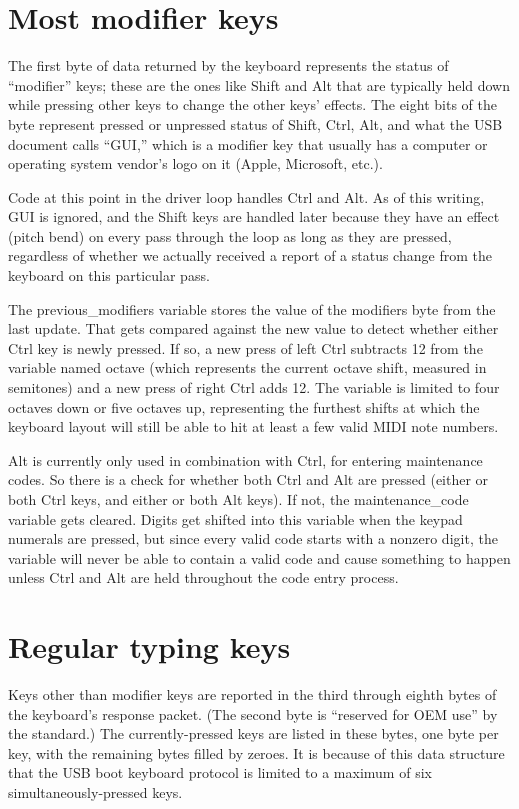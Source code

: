 \section{Most modifier keys}

The first byte of data returned by the keyboard represents the status of
``modifier'' keys; these are the ones like Shift and Alt that are typically
held down while pressing other keys to change the other keys' effects.  The
eight bits of the byte represent pressed or unpressed status of Shift, Ctrl,
Alt, and what the USB document calls ``GUI,'' which is a modifier key that
usually has a computer or operating system vendor's logo on it (Apple,
Microsoft, etc.).

Code at this point in the driver loop handles Ctrl and Alt.  As of this
writing, GUI is ignored, and the Shift keys are handled later because they
have an effect (pitch bend) on every pass through the loop as long as they
are pressed, regardless of whether we actually received a report of a status
change from the keyboard on this particular pass.

The previous\_modifiers variable stores the value of the modifiers byte from
the last update.  That gets compared against the new value to detect whether
either Ctrl key is newly pressed.  If so, a new press of left Ctrl subtracts
12 from the variable named octave (which represents the current octave
shift, measured in semitones) and a new press of right Ctrl adds 12.  The
variable is limited to four octaves down or five octaves up, representing
the furthest shifts at which the keyboard layout will still be able to hit
at least a few valid MIDI note numbers.

Alt is currently only used in combination with Ctrl, for entering
maintenance codes.  So there is a check for whether both Ctrl and Alt are
pressed (either or both Ctrl keys, and either or both Alt keys).  If not,
the maintenance\_code variable gets cleared.  Digits get shifted into this
variable when the keypad numerals are pressed, but since every valid code
starts with a nonzero digit, the variable will never be able to contain a
valid code and cause something to happen unless Ctrl and Alt are held
throughout the code entry process.

\section{Regular typing keys}

Keys other than modifier keys are reported in the third through eighth bytes
of the keyboard's response packet.  (The second byte is ``reserved for OEM
use'' by the standard.)  The currently-pressed keys are listed in these
bytes, one byte per key, with the remaining bytes filled by zeroes.  It is
because of this data structure that the USB boot keyboard protocol is
limited to a maximum of six simultaneously-pressed keys.

